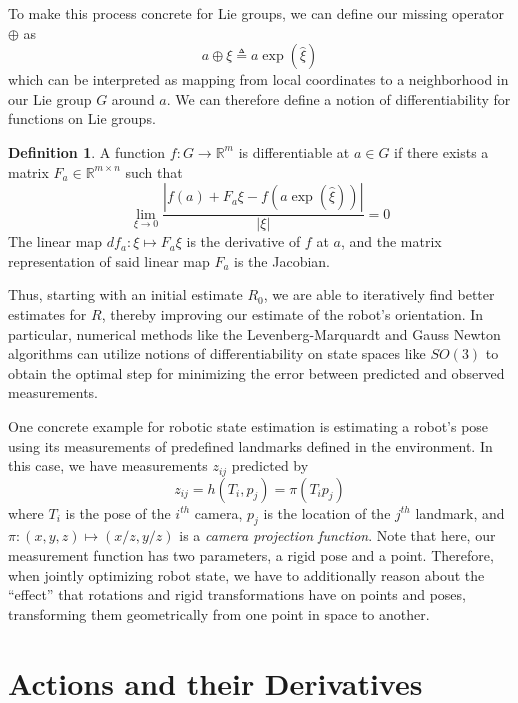 \documentclass[reqno]{amsart}
\theoremstyle{definition}
\newtheorem{defn}{Definition}[section]
\numberwithin{equation}{section}
\begin{document}
To make this process concrete for Lie groups, we can define our missing operator $\oplus$ as
\begin{equation}
    a \oplus \xi \triangleq a\exp(\hat\xi)
\end{equation}
which can be interpreted as mapping from local coordinates to a neighborhood in our Lie group $G$ around $a$. We can therefore define a notion of differentiability for functions on Lie groups.

\begin{defn}
    A function $f : G \to \mathbb{R}^m$ is differentiable at $a \in G$ if there exists a matrix $F_a \in \mathbb{R}^{m \times n}$ such that
    \begin{equation*}
        \lim_{\xi \to 0} \frac{|f(a) + F_a\xi - f(a\exp(\hat\xi))|}{|\xi|} = 0
    \end{equation*}
    The linear map $df_a : \xi \mapsto F_a\xi$ is the derivative of $f$ at $a$, and the matrix representation of said linear map $F_a$ is the Jacobian.
\end{defn}

Thus, starting with an initial estimate $R_0$, we are able to iteratively find better estimates for $R$, thereby improving our estimate of the robot's orientation. In particular, numerical methods like the Levenberg-Marquardt and Gauss Newton algorithms can utilize notions of differentiability on state spaces like $SO(3)$ to obtain the optimal step for minimizing the error between predicted and observed measurements.

One concrete example for robotic state estimation is estimating a robot's pose using its measurements of predefined landmarks defined in the environment. In this case, we have measurements $z_{ij}$ predicted by
\begin{equation*}
    z_{ij} = h(T_i, p_j) = \pi(T_ip_j)
\end{equation*}
where $T_i$ is the pose of the $i^{th}$ camera, $p_j$ is the location of the $j^{th}$ landmark, and $\pi : (x, y, z) \mapsto (x/z, y/z)$ is a \textit{camera projection function}. Note that here, our measurement function has two parameters, a rigid pose and a point. Therefore, when jointly optimizing robot state, we have to additionally reason about the ``effect'' that rotations and rigid transformations have on points and poses, transforming them geometrically from one point in space to another.

\section{Actions and their Derivatives}
\end{document}
